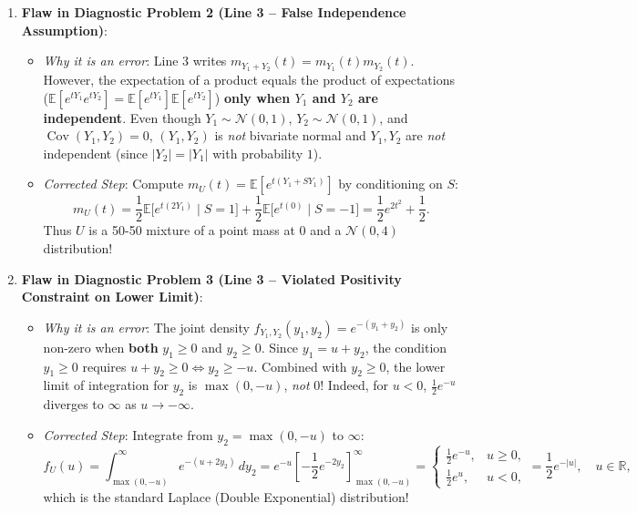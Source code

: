 \documentclass[11pt, letterpaper]{article}
\theoremstyle{definition}
\theoremstyle{remark}
\newcommand{\R}{\mathbb{R}}
\newcommand{\E}{\mathbb{E}}
\begin{document}
\begin{itemize}
\begin{enumerate}[label=\textbf{Resolution \arabic*:}]
    \item \textbf{Flaw in Diagnostic Problem 2 (Line 3 -- False Independence Assumption)}:
    \begin{itemize}
        \item \textit{Why it is an error}: Line 3 writes $m_{Y_1 + Y_2}(t) = m_{Y_1}(t) m_{Y_2}(t)$. However, the expectation of a product equals the product of expectations ($\E[e^{tY_1} e^{tY_2}] = \E[e^{tY_1}]\E[e^{tY_2}]$) \textbf{only when $Y_1$ and $Y_2$ are independent}. Even though $Y_1 \sim \mathcal{N}(0, 1)$, $Y_2 \sim \mathcal{N}(0, 1)$, and $\operatorname{Cov}(Y_1, Y_2) = 0$, $(Y_1, Y_2)$ is \textit{not} bivariate normal and $Y_1, Y_2$ are \textit{not} independent (since $|Y_2| = |Y_1|$ with probability $1$).
        \item \textit{Corrected Step}: Compute $m_U(t) = \E[e^{t(Y_1 + S Y_1)}]$ by conditioning on $S$:
        \[
            m_U(t) = \frac{1}{2}\E\big[e^{t(2Y_1)} \mid S = 1\big] + \frac{1}{2}\E\big[e^{t(0)} \mid S = -1\big] = \frac{1}{2} e^{2t^2} + \frac{1}{2}.
        \]
        Thus $U$ is a 50-50 mixture of a point mass at $0$ and a $\mathcal{N}(0, 4)$ distribution!
    \end{itemize}

    \item \textbf{Flaw in Diagnostic Problem 3 (Line 3 -- Violated Positivity Constraint on Lower Limit)}:
    \begin{itemize}
        \item \textit{Why it is an error}: The joint density $f_{Y_1, Y_2}(y_1, y_2) = e^{-(y_1 + y_2)}$ is only non-zero when \textbf{both} $y_1 \ge 0$ and $y_2 \ge 0$. Since $y_1 = u + y_2$, the condition $y_1 \ge 0$ requires $u + y_2 \ge 0 \iff y_2 \ge -u$. Combined with $y_2 \ge 0$, the lower limit of integration for $y_2$ is $\max(0, -u)$, \textit{not} $0$! Indeed, for $u < 0$, $\frac{1}{2}e^{-u}$ diverges to $\infty$ as $u \to -\infty$.
        \item \textit{Corrected Step}: Integrate from $y_2 = \max(0, -u)$ to $\infty$:
        \[
            f_U(u) = \int_{\max(0, -u)}^{\infty} e^{-(u + 2y_2)} \, dy_2 = e^{-u} \left[ -\frac{1}{2}e^{-2y_2} \right]_{\max(0, -u)}^{\infty} = \begin{cases}
                \frac{1}{2}e^{-u}, & u \ge 0, \\
                \frac{1}{2}e^{u}, & u < 0,
            \end{cases} = \frac{1}{2}e^{-|u|}, \quad u \in \R,
        \]
        which is the standard Laplace (Double Exponential) distribution!
    \end{itemize}


\end{enumerate}
\end{itemize}
\end{document}
